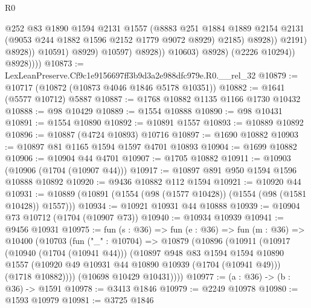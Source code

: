 \begin{lexlean}{R0}
\begin{coremodule}
                                      @252
                                      @83
                                      @1890
                                      @1594
                                      @2131
                                      @1557
                                      (@8883
                                        @251
                                        @1884
                                        @1889
                                        @2154
                                        @2131
                                        (@9053 @244 @1882 @1596 @2152 @1779 @9072 @8929)
                                        @2185)
                                      @8928))
                                  @2191)
                                @8928))
                            @10591)
                          @8929)
                        @10597)
                      @8928))
                  @10603)
                @8928)
              (@2226 @10294))
            @8928))))
@10873 := LexLeanPreserve.Cf9c1e9156697ff3b9d3a2e988dfc979e.R0.__rel_32
@10879 := @10717 (@10872 (@10873 @4046 @1846 @5178 @10351))
@10882 := @1641 (@5577 @10712) @5887
@10887 := @1768 @10882 @1135 @1166 @1730 @10432
@10888 := @98 @10429
@10889 := @1554 @10888
@10890 := @98 @10431
@10891 := @1554 @10890
@10892 := @10891 @1557
@10893 := @10889 @10892
@10896 := @10887 (@4724 @10893) @10716
@10897 := @1690 @10882
@10903 := @10897 @81 @1165 @1594 @1597 @4701 @10893
@10904 := @1699 @10882
@10906 := @10904 @44 @4701
@10907 := @1705 @10882
@10911 := @10903 (@10906 (@1704 (@10907 @44)))
@10917 := @10897 @891 @950 @1594 @1596 @10888 @10892
@10920 := @9436 @10882 @112 @1594
@10921 := @10920 @44
@10931 := @10889 (@10891 (@1554 (@98 (@1577 @10428)) (@1554 (@98 (@1581 @10428)) @1557)))
@10934 := @10921 @10931 @44 @10888
@10939 := @10904 @73 @10712 (@1704 (@10907 @73))
@10940 := @10934 @10939
@10941 := @9456 @10931
@10975 := fun (s : @36) =>
  fun (e : @36) =>
  fun (m : @36) =>
  @10400
    (@10703
      (fun ("_" : @10704) =>
      @10879
        (@10896
          (@10911
            (@10917
              (@10940 (@1704 (@10941 @44)))
              (@10897
                @948
                @83
                @1594
                @1594
                @10890
                @1557
                (@10920 @49 @10931 @44 @10890 @10939 (@1704 (@10941 @49)))
                (@1718 @10882))))
          (@10698 @10429 @10431))))
@10977 := (a : @36) -> (b : @36) -> @1591
@10978 := @3413 @1846
@10979 := @2249 @10978
@10980 := @1593 @10979
@10981 := @3725 @1846

\end{coremodule}
\end{lexlean}
